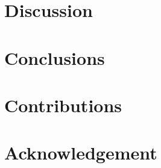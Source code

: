 \documentclass[12pt, letterpaper]{article}
\begin{document}
\section{Discussion}

\section{Conclusions}

\section*{Contributions}

\section*{Acknowledgement}

\newpage

\singlespacing

\printbibliography

\newpage
\end{document}
